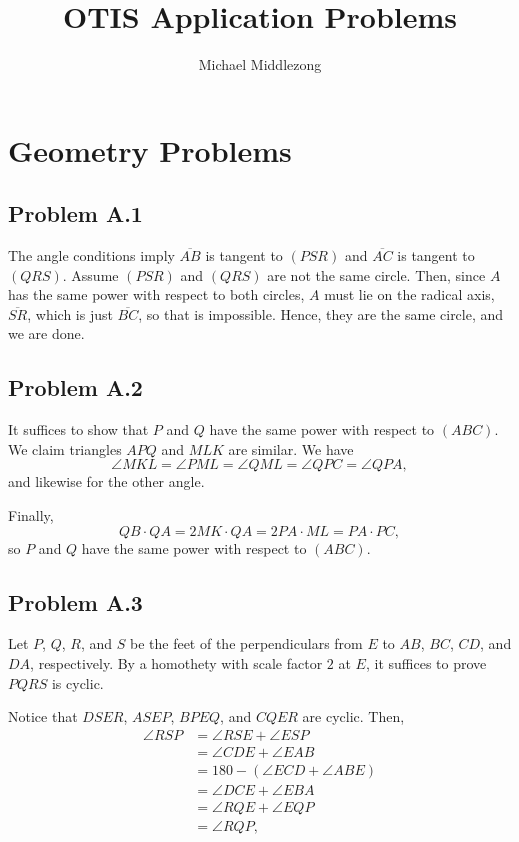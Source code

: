 \documentclass{scrartcl}
\title{OTIS Application Problems}
\author{Michael Middlezong}
\begin{document}

\maketitle

\section*{Geometry Problems}
\subsection*{Problem A.1}
The angle conditions imply $\overline{AB}$ is tangent to $(PSR)$ and $\overline{AC}$ is tangent to $(QRS)$.
Assume $(PSR)$ and $(QRS)$ are not the same circle.
Then, since $A$ has the same power with respect to both circles, $A$ must lie on the radical axis, $\overline{SR}$, which is just $\overline{BC}$, so that is impossible.
Hence, they are the same circle, and we are done.

\subsection*{Problem A.2}
It suffices to show that $P$ and $Q$ have the same power with respect to $(ABC)$.
We claim triangles $APQ$ and $MLK$ are similar.
We have
\[ \angle MKL = \angle PML = \angle QML = \angle QPC = \angle QPA, \]
and likewise for the other angle.

Finally,
\[ QB \cdot QA = 2MK \cdot QA = 2PA \cdot ML = PA \cdot PC, \]
so $P$ and $Q$ have the same power with respect to $(ABC)$.

\subsection*{Problem A.3}
Let $P$, $Q$, $R$, and $S$ be the feet of the perpendiculars from $E$ to $AB$, $BC$, $CD$, and $DA$, respectively.
By a homothety with scale factor $2$ at $E$, it suffices to prove $PQRS$ is cyclic.

Notice that $DSER$, $ASEP$, $BPEQ$, and $CQER$ are cyclic.
Then,
\begin{align*}
    \angle RSP &= \angle RSE + \angle ESP \\
    &= \angle CDE + \angle EAB \\
    &= 180 - (\angle ECD + \angle ABE) \\
    &= \angle DCE + \angle EBA \\
    &= \angle RQE + \angle EQP \\
    &= \angle RQP,
\end{align*}
\end{document}
